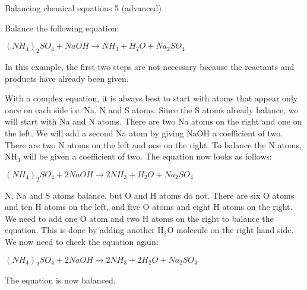 \begin{wex}{Balancing chemical equations 5 (advanced)}{Balance the following equation:

\begin{center}
\rm${(NH_{4})_{2}SO_{4} + NaOH \rightarrow NH_{3} + H_{2}O + Na_{2}SO_{4}}$
\end{center}

In this example, the first two steps are not necessary because the reactants and products have already been given.\\
}

{
With a complex equation, it is always best to start with atoms that appear only once on each side i.e. Na, N and S atoms. Since the S atoms already balance, we will start with Na and N atoms. There are two Na atoms on the right and one on the left. We will add a second Na atom by giving NaOH a coefficient of two. There are two N atoms on the left and one on the right. To balance the N atoms, NH$_{3}$ will be given a coefficient of two. The equation now looks as follows:

\begin{center}
\rm${(NH_{4})_{2}SO_{4} + 2NaOH \rightarrow 2NH_{3} + H_{2}O + Na_{2}SO_{4}}$\\
\end{center}
}

{
N, Na and S atoms balance, but O and H atoms do not. There are six O atoms and ten H atoms on the left, and five O atoms and eight H atoms on the right. We need to add one O atom and two H atoms on the right to balance the equation. This is done by adding another H$_{2}$O molecule on the right hand side. We now need to check the equation again:

\begin{center}
\rm${(NH_{4})_{2}SO_{4} + 2NaOH \rightarrow 2NH_{3} + 2H_{2}O + Na_{2}SO_{4}}$\\
\end{center}

The equation is now balanced.
}
\end{wex}

